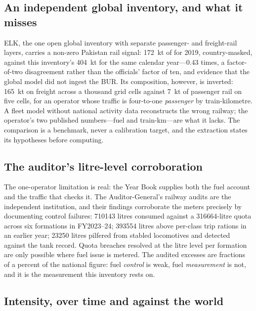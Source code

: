 \subsection{An independent global inventory, and what it misses}

ELK, the one open global inventory with separate passenger- and freight-rail layers,
carries a non-zero Pakistan rail signal: \SI{172}{\kilo\tonne} of \COtwo{} for 2019,
country-masked, against this inventory's \SI{404}{\kilo\tonne} for the same calendar
year---\num{0.43} times, a factor-of-two disagreement rather than the officials' factor of
ten, and evidence that the global model did not ingest the BUR. Its composition, however,
is inverted: \SI{165}{\kilo\tonne} on freight across a thousand grid cells against
\SI{7}{\kilo\tonne} of passenger rail on five cells, for an operator whose traffic is
four-to-one \emph{passenger} by train-kilometre. A fleet model without national activity
data reconstructs the wrong railway; the operator's two published numbers---fuel and
train-km---are what it lacks. The comparison is a benchmark, never a calibration target,
and the extraction states its hypotheses before computing.

\subsection{The auditor's litre-level corroboration}

The one-operator limitation is real: the Year Book supplies both the fuel account and the
traffic that checks it. The Auditor-General's railway audits are the independent
institution, and their findings corroborate the meters precisely by documenting control
failures: \num{710143} litres consumed against a \num{316664}-litre quota across six
formations in FY2023--24; \num{393554} litres above per-class trip rations in an earlier
year; \num{23250} litres pilfered from stabled locomotives and detected against the tank
record. Quota breaches resolved at the litre level per formation are only possible where
fuel issue is metered. The audited excesses are fractions of a percent of the national
figure: fuel \emph{control} is weak, fuel \emph{measurement} is not, and it is the
measurement this inventory rests on.

\subsection{Intensity, over time and against the world}


